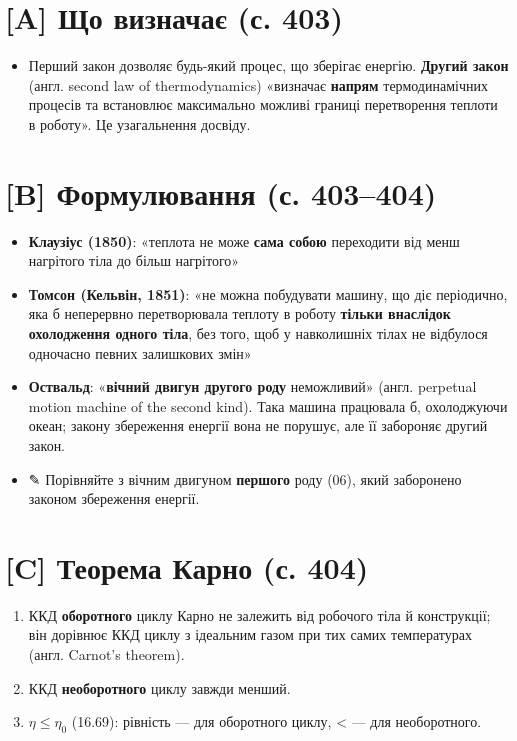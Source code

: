 \documentclass[11pt,a4paper,oneside]{book}
\newcommand{\pen}{{\sffamily\color{accent}✎}}
\begin{document}
\section*{[A] Що визначає (с. 403)}
\begin{itemize}
\item Перший закон дозволяє будь-який процес, що зберігає енергію. \textbf{Другий закон} (англ. second law of thermodynamics) «визначає \textbf{напрям} термодинамічних процесів та встановлює максимально можливі границі перетворення теплоти в роботу». Це узагальнення досвіду.
\end{itemize}

\section*{[B] Формулювання (с. 403–404)}
\begin{itemize}
\item \textbf{Клаузіус (1850)}: «теплота не може \textbf{сама собою} переходити від менш нагрітого тіла до більш нагрітого»
\item \textbf{Томсон (Кельвін, 1851)}: «не можна побудувати машину, що діє періодично, яка б неперервно перетворювала теплоту в роботу \textbf{тільки внаслідок охолодження одного тіла}, без того, щоб у навколишніх тілах не відбулося одночасно певних залишкових змін»
\item \textbf{Оствальд}: «\textbf{вічний двигун другого роду} неможливий» (англ. perpetual motion machine of the second kind). Така машина працювала б, охолоджуючи океан; закону збереження енергії вона не порушує, але її забороняє другий закон.
\item \pen{} Порівняйте з вічним двигуном \textbf{першого} роду (06), який заборонено законом збереження енергії.
\end{itemize}

\section*{[C] Теорема Карно (с. 404)}
\begin{enumerate}
\item ККД \textbf{оборотного} циклу Карно не залежить від робочого тіла й конструкції; він дорівнює ККД циклу з ідеальним газом при тих самих температурах (англ. Carnot's theorem).
\item ККД \textbf{необоротного} циклу завжди менший.
\item $\eta \le \eta_0$ (16.69): рівність — для оборотного циклу, < — для необоротного.
\end{enumerate}
\end{document}
